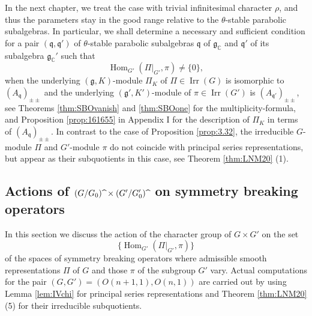 In the next chapter,
 we treat the case
 with trivial infinitesimal character $\rho$,
 and thus the parameters stay in the good range
 relative to the $\theta$-stable parabolic subalgebras.  
In particular,
 we shall determine a necessary and sufficient condition
 for a pair $({\mathfrak{q}}, {\mathfrak{q}}')$
 of $\theta$-stable parabolic subalgebras ${\mathfrak{q}}$ of ${\mathfrak{g}}_{\mathbb{C}}$
 and ${\mathfrak{q}}'$ of its subalgebra ${\mathfrak{g}}_{\mathbb{C}}'$
 such that 
\[
  {\operatorname{Hom}}_{G'}(\Pi|_{G'}, \pi) \ne \{0\}, 
\]
 when the underlying $({\mathfrak{g}},K)$-module $\Pi_K$
 of $\Pi \in {\operatorname{Irr}}(G)$
 is isomorphic to 
 $(A_{\mathfrak{q}})_{\pm\pm}$ 
 and the underlying $({\mathfrak{g}}',K')$-module
 of $\pi \in {\operatorname{Irr}}(G')$
 is $(A_{\mathfrak{q}'})_{\pm \pm}$, 
 see Theorems \ref{thm:SBOvanish} and \ref{thm:SBOone}
 for the multiplicity-formula, 
 and Proposition \ref{prop:161655} in Appendix I
 for the description of $\Pi_K$ in terms of $(A_{\mathfrak{q}})_{\pm\pm}$.  
In contrast to the case of Proposition \ref{prop:3.32}, 
 the irreducible $G$-module $\Pi$
 and $G'$-module $\pi$ do not coincide with principal series representations,
 but appear as their subquotients in this case, 
 see Theorem \ref{thm:LNM20} (1).  



\subsection{Actions
 of $(G/G_0)
\hspace{1mm}
{\widehat{}}
\, 
\times (G'/G_0')
\hspace{1MM}
{\widehat{}}
\,$ on symmetry breaking operators}
\label{subsec:actPont}

In this section 
 we discuss the action of the character group of $G \times G'$
 on the set 
\[
  \{ {\operatorname{Hom}}_{G'}(\Pi|_{G'}, \pi) \}
\]
 of the spaces of symmetry breaking operators 
 where admissible smooth representations $\Pi$ of $G$
 and those $\pi$ of the subgroup $G'$ vary.  
Actual computations for the pair
 $(G,G')=(O(n+1,1),O(n,1))$ are carried out
 by using Lemma \ref{lem:IVchi}
 for principal series representations
 and Theorem \ref{thm:LNM20} (5) for their irreducible subquotients.  
